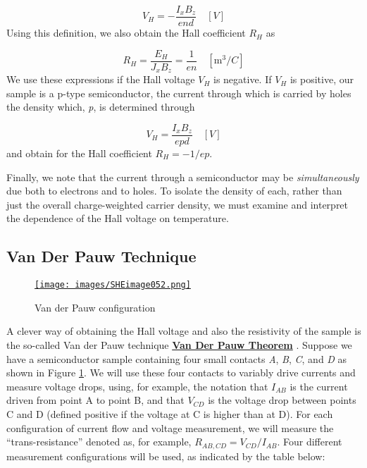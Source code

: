 \documentclass{../lab}
\begin{document}
\begin{equation}
    V_H=-\frac{I_xB_z}{end} \quad [V]
\end{equation}
Using this definition, we also obtain the Hall coefficient $ R_H $ as

\begin{equation}
    R_H=\frac{E_H}{J_xB_z}=\frac{1}{en} \quad [\text{m}^3/C]
\end{equation}
We use these expressions if the Hall voltage $ V_H $ is negative. If $ V_H $ is positive, our sample is a p-type semiconductor, the current through which is carried by holes the density which, \emph{p}, is determined through

\begin{equation}
    V_H=\frac{I_xB_z}{epd} \quad [V]
\end{equation}
and obtain for the Hall coefficient $R_H = -1/ep$.

Finally, we note that the current through a semiconductor may be \emph{simultaneously} due both to electrons and to holes. To isolate the density of each, rather than just the overall charge-weighted carrier density, we must examine and interpret the dependence of the Hall voltage on temperature.

\subsection{Van Der Pauw Technique}

\begin{figure}[h]
    \centering
    \href{http://experimentationlab.berkeley.edu/sites/default/files/images/SHEimage052.gif}{\texttt{[image: images/SHEimage052.png]}}
    \caption{Van der Pauw configuration}
    \label{fig:VanDerPauwConfiguration}
\end{figure}

A clever way of obtaining the Hall voltage and also the resistivity of the sample is the so-called Van der Pauw technique \href{http://experimentationlab.berkeley.edu/node/105}{\textbf{Van Der Pauw Theorem}} . Suppose we have a semiconductor sample containing four small contacts \emph{A}, \emph{B}, \emph{C}, and \emph{D} as shown in Figure \ref{fig:VanDerPauwConfiguration}. We will use these four contacts to variably drive currents and measure voltage drops, using, for example, the notation that $I_{AB}$ is the current driven from point A to point B, and that $V_{CD}$ is the voltage drop between points C and D (defined positive if the voltage at C is higher than at D). For each configuration of current flow and voltage measurement, we will measure the ``trans-resistance'' denoted as, for example, $R_{AB,CD} = V_{CD} / I_{AB}$. Four different measurement configurations will be used, as indicated by the table below:
\end{document}
